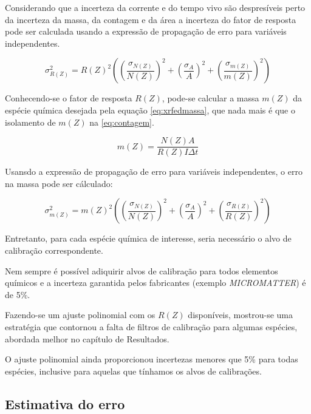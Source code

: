 Considerando que a incerteza da corrente e do tempo vivo são 
despresíveis perto da incerteza da massa, da contagem e da área 
a incerteza do fator de resposta pode ser calculada usando a expressão
de propagação de erro para variáveis independentes.

\begin{equation}
  \label{eq:erro_fator_de_resposta}
  \sigma_{R(Z)}^2 = {R(Z)}^2 \left( \left(\frac{\sigma_{N(Z)}}{N(Z)}\right)^2 + 
                                  \left(\frac{\sigma_A}{A}\right)^2 + 
                                  \left(\frac{\sigma_{m(Z)}}{m(Z)}\right)^2 
                           \right)
\end{equation}

Conhecendo-se o fator de resposta $R(Z)$, pode-se calcular a massa $m(Z)$ da espécie química
desejada pela equação \ref{eq:xrfedmassa}, que nada mais é que o isolamento de $m(Z)$ na 
\ref{eq:contagem}. 

\begin{equation}
  \label{eq:xrfedmassa}
  m(Z) = \frac{N(Z) A}{ R(Z)I \Delta t}
\end{equation}

Usansdo a expressão de propagação de erro para variáveis independentes, 
o erro na massa pode ser cálculado:

\begin{equation}
  \label{eq:erro_massa}
  \sigma_{m(Z)}^2 = {m(Z)}^2 \left( \left(\frac{\sigma_{N(Z)}}{N(Z)}\right)^2 + 
                                  \left(\frac{\sigma_A}{A}\right)^2 + 
                                  \left(\frac{\sigma_{R(Z)}}{R(Z)}\right)^2 
                           \right)
\end{equation}


Entretanto, para cada espécie química de interesse, seria necessário 
o alvo de calibração correspondente.

Nem sempre é possível adiquirir alvos de calibração para todos elementos
químicos e a incerteza garantida pelos fabricantes (exemplo \textit{MICROMATTER}) é de
5\%. 

Fazendo-se um ajuste polinomial com os $R(Z)$ disponíveis, mostrou-se uma estratégia 
que contornou a falta de filtros de calibração para algumas espécies, abordada melhor
no capítulo de Resultados. 

O ajuste polinomial ainda proporcionou incertezas menores que 5\% para todas espécies, 
inclusive para aquelas que tínhamos os alvos de calibrações.

\subsection{Estimativa do erro}

